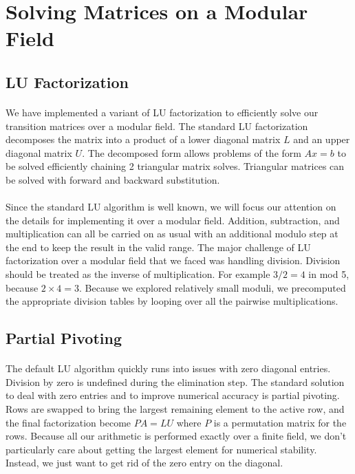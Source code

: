 \documentclass[11pt]{article}
\begin{document}
\section*{Solving Matrices on a Modular Field}

\subsection*{LU Factorization}
\paragraph{} We have implemented a variant of LU factorization to efficiently solve our transition matrices over a modular field.  The standard LU factorization decomposes the matrix into a product of a lower diagonal matrix $L$ and an upper diagonal matrix $U$.  The decomposed form allows problems of the form $Ax = b$ to be solved efficiently chaining 2 triangular matrix solves.  Triangular matrices can be solved with forward and backward substitution.


\paragraph{} Since the standard LU algorithm is well known, we will focus our attention on the details for implementing it over a modular field.  Addition, subtraction, and multiplication can all be carried on as usual with an additional modulo step at the end to keep the result in the valid range.  The major challenge of LU factorization over a modular field that we faced was handling division.  Division should be treated as the inverse of multiplication.  For example $3 / 2 = 4$ in mod 5, because $2 \times 4 = 3$.  Because we explored relatively small moduli, we precomputed the appropriate division tables by looping over all the pairwise multiplications.


\subsection*{Partial Pivoting}
\paragraph{} The default LU algorithm quickly runs into issues with zero diagonal entries.  Division by zero is undefined during the elimination step.  The standard solution to deal with zero entries and to improve numerical accuracy is partial pivoting.  Rows are swapped to bring the largest remaining element to the active row, and the final factorization become $PA = LU$ where $P$ is a permutation matrix for the rows.  Because all our arithmetic is performed exactly over a finite field, we don’t particularly care about getting the largest element for numerical stability.  Instead, we just want to get rid of the zero entry on the diagonal.
\end{document}
